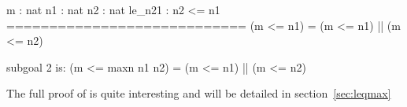 \begin{coqout}{}{}
  m : nat
  n1 : nat
  n2 : nat
  le_n21 : n2 <= n1
  ============================
   (m <= n1) = (m <= n1) || (m <= n2)

subgoal 2 is:
 (m <= maxn n1 n2) = (m <= n1) || (m <= n2)
\end{coqout}

The full proof of  is quite interesting and will be
detailed in section~\ref{sec:leqmax}






%
%



